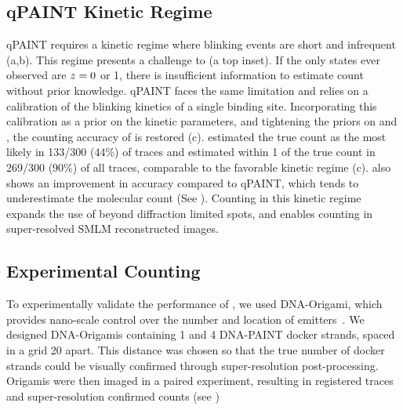 \subsection{qPAINT Kinetic Regime} \label{results:qpaint}
qPAINT requires a kinetic regime where blinking 
	events are short and infrequent~\citep{jungmann_2016} (a,b).
	This regime presents a challenge to \ours (a top inset). 
	If the only states ever observed are $z_{}=0$ or 1, there is insufficient 
	information to estimate count without prior knowledge.
	qPAINT faces the same limitation and relies on a calibration 
	of the blinking kinetics of a single binding site.
	Incorporating this calibration as a prior on the kinetic parameters, 
	and tightening the priors on \re and \rb, the counting 
	accuracy of \ours is restored (c). 
	\ours estimated the true count as the most likely in 133/300 (44\%) of traces and 
	estimated within 1 of the true count in 269/300 (90\%) of all traces,
	comparable to the favorable kinetic regime (c).
	\ours also shows an improvement in accuracy compared to qPAINT, which tends 
	to underestimate the molecular count (See ).
	Counting in this kinetic regime expands the use of \ours beyond diffraction limited spots, 
	and enables counting in super-resolved SMLM reconstructed images.
	
\subsection{Experimental Counting}
To experimentally validate the performance of \ours, we used DNA-Origami, 
which provides nano-scale control over the number and location of emitters~\citep{rothemund_folding_2006, strauss_2018}.
	We designed DNA-Origamis containing 1 and 4 DNA-PAINT docker strands, 
	spaced in a grid 20 \nanometer apart. 
	This distance was chosen so that the true number of docker strands 
	could be visually confirmed through super-resolution post-processing.
	Origamis were then imaged in a paired experiment, resulting in registered 
	traces and super-resolution confirmed counts (see )

